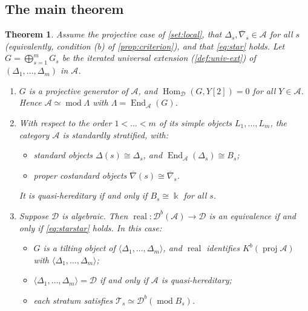\documentclass[11pt,reqno]{amsart}
\theoremstyle{plain}
\newtheorem{theorem}{Theorem}[section]
\theoremstyle{definition}
\theoremstyle{remark}
\newcommand{\kk}{\Bbbk}
\DeclareMathOperator{\Hom}{Hom}
\DeclareMathOperator{\End}{End}
\DeclareMathOperator{\real}{real}
\newcommand{\modd}{\operatorname{mod}}
\newcommand{\proj}{\operatorname{proj}}
\newcommand{\Db}{\mathcal{D}^b}
\newcommand{\Kb}{K^b}
\newcommand{\thick}[1]{\langle #1\rangle}
\newcommand{\nablabar}{\overline{\nabla}}
\newcommand{\cD}{\mathcal{D}}
\newcommand{\cA}{\mathcal{A}}
\newcommand{\cT}{\mathcal{T}}
\begin{document}
\subsection{The main theorem}
\begin{theorem}\label{thm:A}
Assume the projective case of \cref{set:local}, that $\Delta_s,\nablabar_s\in\cA$ for all $s$ (equivalently, condition \textup{(b)} of \cref{prop:criterion}), and that \eqref{eq:star} holds. Let $G=\bigoplus_{s=1}^mG_s$ be the iterated universal extension (\cref{def:univ-ext}) of $(\Delta_1,\dots,\Delta_m)$ in $\cA$.
\begin{enumerate}
\item $G$ is a projective generator of $\cA$, and $\Hom_\cD(G,Y[2])=0$ for all $Y\in\cA$. Hence $\cA\simeq\modd\Lambda$ with $\Lambda=\End_\cA(G)$.
\item With respect to the order $1<\dots<m$ of its simple objects $L_1,\dots,L_m$, the category $\cA$ is standardly stratified, with:
\begin{itemize}
\item standard objects $\Delta(s)\cong\Delta_s$, and $\End_\cA(\Delta_s)\cong B_s$;
\item proper costandard objects $\nablabar(s)\cong\nablabar_s$.
\end{itemize}
It is quasi-hereditary if and only if $B_s\cong\kk$ for all $s$.
\item Suppose $\cD$ is algebraic. Then $\real\colon\Db(\cA)\to\cD$ is an equivalence if and only if \eqref{eq:starstar} holds. In this case:
\begin{itemize}
\item $G$ is a tilting object of $\thick{\Delta_1,\dots,\Delta_m}$, and $\real$ identifies $\Kb(\proj\cA)$ with $\thick{\Delta_1,\dots,\Delta_m}$;
\item $\thick{\Delta_1,\dots,\Delta_m}=\cD$ if and only if $\cA$ is quasi-hereditary;
\item each stratum satisfies $\cT_s\simeq\Db(\modd B_s)$.
\end{itemize}
\end{enumerate}
\end{theorem}
\end{document}
